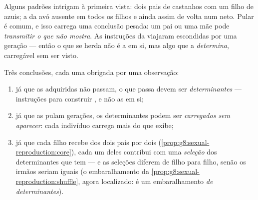 \begin{example}\label{ex:g9:heredity-and-traits:skip}
Alguns padrões intrigam à primeira vista: dois pais de 
castanhos com um filho de  azuis; a  da
avó ausente em todos os filhos e ainda assim de volta num
neto. Pular é comum, e isso carrega uma conclusão pesada: um
pai ou uma mãe pode \emph{transmitir o que não mostra}. As
instruções da  viajaram escondidas por uma
geração --- então o que se herda não é a  em
si, mas algo que a \emph{determina}, carregável sem ser
visto.
\end{example}

\begin{proposition}\label{prop:g9:heredity-and-traits:conclusions}
Três conclusões, cada uma obrigada por uma observação:
\begin{enumerate}
  \item já que as  adquiridas não passam, o
        que passa devem ser \emph{determinantes} ---
        instruções para construir , e não as
         em si;
  \item já que as  pulam gerações, os
        determinantes podem ser \emph{carregados sem
        aparecer}: cada indivíduo carrega mais do que exibe;
  \item já que cada filho recebe dos dois pais por dois
        (\cref{prop:g8:sexual-reproduction:core}), cada um
        deles contribui com uma \emph{seleção} dos
        determinantes que tem --- e as seleções diferem de
        filho para filho, senão os irmãos seriam iguais (o
        embaralhamento da
        \cref{prop:g8:sexual-reproduction:shuffle}, agora
        localizado: é um embaralhamento \emph{de
        determinantes}).
\end{enumerate}
\end{proposition}
\admitted

